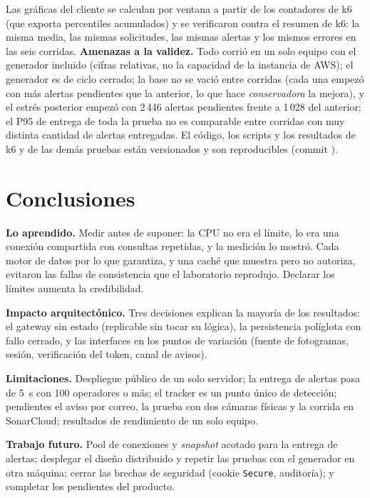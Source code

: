 \documentclass[conference]{IEEEtran}
\begin{document}
Las gráficas del cliente se calculan por ventana a partir de los contadores de k6 (que exporta percentiles acumulados) y se verificaron contra el resumen de k6: la misma media, las mismas solicitudes, las
mismas alertas y los mismos errores en las seis corridas. \textbf{Amenazas a la validez.} Todo corrió en un solo equipo con el generador incluido (cifras relativas, no la capacidad de la instancia de
AWS); el generador es de ciclo cerrado; la base no se vació entre corridas (cada una empezó con más alertas pendientes que la anterior, lo que hace \emph{conservadora} la mejora), y el estrés
posterior empezó con 2\,446 alertas pendientes frente a 1\,028 del anterior; el P95 de entrega de toda la prueba no es comparable entre corridas con muy distinta cantidad de alertas entregadas.
El código, los scripts y los resultados de k6 y de las demás pruebas están versionados y son reproducibles (commit \texttt{\versionrepo}).

\section{Conclusiones}
\textbf{Lo aprendido.} Medir antes de suponer: la CPU no era el límite, lo era una conexión compartida con consultas repetidas, y la medición lo mostró. Cada motor de datos por lo que
garantiza, y una caché que muestra pero no autoriza, evitaron las fallas de consistencia que el laboratorio reprodujo. Declarar los límites aumenta la credibilidad.

\textbf{Impacto arquitectónico.} Tres decisiones explican la mayoría de los resultados: el gateway sin estado (replicable sin tocar su lógica), la persistencia políglota con fallo
cerrado, y las interfaces en los puntos de variación (fuente de fotogramas, sesión, verificación del token, canal de avisos).

\textbf{Limitaciones.} Despliegue público de un solo servidor; la entrega de alertas pasa de 5~s con 100 operadores o más; el tracker es un punto único de detección; pendientes el aviso por correo,
la prueba con dos cámaras físicas y la corrida en SonarCloud; resultados de rendimiento de un solo equipo.

\textbf{Trabajo futuro.} Pool de conexiones y \emph{snapshot} acotado para la entrega de alertas; desplegar el diseño distribuido y repetir las pruebas con el generador en otra máquina; cerrar las
brechas de seguridad (cookie \texttt{Secure}, auditoría); y completar los pendientes del producto.
\end{document}
